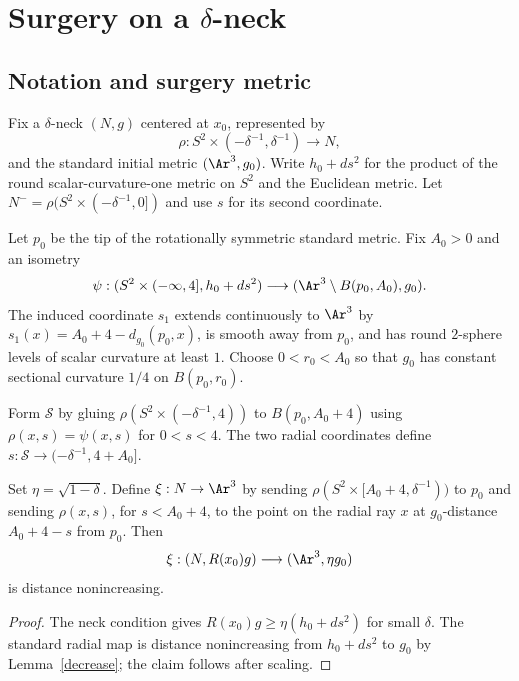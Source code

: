\chapter{Surgery on a $\delta$-neck}
\label{chap:surgery-delta-neck}

\section{Notation and surgery metric}
\label{necksurgery}

Fix a $\delta$-neck $(N,g)$ centered at $x_0$, represented by
\[
  \rho:S^2\times(-\delta^{-1},\delta^{-1})\longrightarrow N,
\]
and the standard initial metric $(\Ar^3,g_0)$. Write $h_0+ds^2$ for the
product of the round scalar-curvature-one metric on $S^2$ and the Euclidean
metric. Let $N^-=\rho(S^2\times(-\delta^{-1},0])$ and use $s$ for its second
coordinate.

Let $p_0$ be the tip of the rotationally symmetric standard metric. Fix
$A_0>0$ and an isometry
\[
  \psi:(S^2\times(-\infty,4],h_0+ds^2)
  \longrightarrow(\Ar^3\setminus B(p_0,A_0),g_0).
\]
The induced coordinate $s_1$ extends continuously to $\Ar^3$ by
$s_1(x)=A_0+4-d_{g_0}(p_0,x)$, is smooth away from $p_0$, and has round
$2$-sphere levels of scalar curvature at least $1$. Choose
$0<r_0<A_0$ so that $g_0$ has constant sectional curvature $1/4$ on
$B(p_0,r_0)$.

Form ${\mathcal S}$ by gluing
$\rho(S^2\times(-\delta^{-1},4))$ to $B(p_0,A_0+4)$ using $\rho(x,s)=\psi(x,s)$
for $0<s<4$. The two radial coordinates define
$s:{\mathcal S}\to(-\delta^{-1},4+A_0]$.

\begin{claim}
\label{claim:neck-to-cap-distance-decreasing}
\label{distdecrease}
Set $\eta=\sqrt{1-\delta}$. Define $\xi:N\to\Ar^3$ by sending
$\rho(S^2\times[A_0+4,\delta^{-1}))$ to $p_0$ and sending
$\rho(x,s)$, for $s<A_0+4$, to the point on the radial ray $x$ at
$g_0$-distance $A_0+4-s$ from $p_0$. Then
\[
  \xi:(N,R(x_0)g)\longrightarrow(\Ar^3,\eta g_0)
\]
is distance nonincreasing.
\end{claim}

\begin{proof}
\sketch
{}
The neck condition gives
$R(x_0)g\geq\eta(h_0+ds^2)$ for small $\delta$. The standard radial map is
distance nonincreasing from $h_0+ds^2$ to $g_0$ by Lemma~\ref{decrease}; the
claim follows after scaling.
\end{proof}

